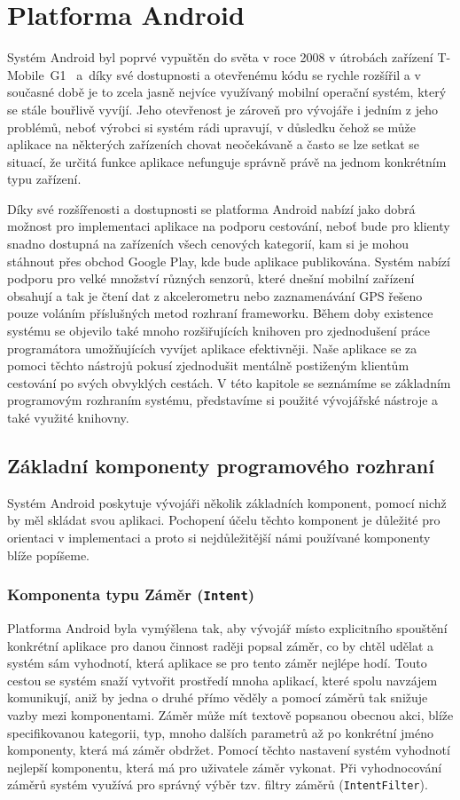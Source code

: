 \documentclass[czech,master,public,dept460,male,java,cpdeclaration]{diploma}
\begin{document}
\section{Platforma Android}
Systém Android byl poprvé vypuštěn do světa v roce 2008 v útrobách zařízení T-Mobile~G1~\cite{androidcentral}
a~díky své dostupnosti a otevřenému kódu se rychle rozšířil a v současné době je to zcela jasně nejvíce využívaný mobilní
operační systém, který se stále bouřlivě vyvíjí. Jeho otevřenost je zároveň pro vývojáře i jedním z jeho problémů,
neboť výrobci si systém rádi upravují, v důsledku čehož se může aplikace na některých zařízeních chovat
neočekávaně a často se lze setkat se situací, že určitá funkce aplikace nefunguje správně právě na
jednom konkrétním typu zařízení.

Díky své rozšířenosti a dostupnosti se platforma Android nabízí jako dobrá možnost pro implementaci
aplikace na podporu cestování, neboť bude pro klienty snadno dostupná na zařízeních všech cenových
kategorií, kam si je mohou stáhnout přes obchod Google Play, kde bude aplikace publikována.
Systém nabízí podporu pro velké množství různých senzorů, které dnešní mobilní zařízení obsahují
a tak je čtení dat z akcelerometru nebo zaznamenávání GPS řešeno pouze voláním příslušných metod
rozhraní frameworku. Během doby existence systému se objevilo také mnoho rozšiřujících knihoven
pro zjednodušení práce programátora umožňujících vyvíjet aplikace efektivněji. Naše aplikace se
za pomoci těchto nástrojů pokusí zjednodušit mentálně postiženým klientům cestování po svých
obvyklých cestách. V této kapitole se seznámíme se základním programovým rozhraním systému, představíme
si použité vývojářské nástroje a také využité knihovny.

\subsection{Základní komponenty programového rozhraní}
Systém Android poskytuje vývojáři několik základních komponent, pomocí nichž by měl skládat svou aplikaci.
Pochopení účelu těchto komponent je důležité pro orientaci v implementaci a proto si nejdůležitější námi
používané komponenty blíže popíšeme.

\subsubsection{Komponenta typu Záměr (\texttt{Intent})}
Platforma Android byla vymýšlena tak, aby vývojář místo explicitního spouštění konkrétní aplikace pro danou činnost
raději popsal záměr, co by chtěl udělat a systém sám vyhodnotí, která aplikace se pro tento záměr nejlépe
hodí. Touto cestou se systém snaží vytvořit prostředí mnoha aplikací, které spolu navzájem komunikují,
aniž by jedna o druhé přímo věděly a pomocí záměrů tak snižuje vazby mezi komponentami. Záměr může mít
textově popsanou obecnou akci, blíže specifikovanou kategorii, typ, mnoho dalších parametrů až po konkrétní
jméno komponenty, která má záměr obdržet. Pomocí těchto nastavení systém vyhodnotí nejlepší komponentu,
která má pro uživatele záměr vykonat. Při vyhodnocování záměrů systém využívá pro správný výběr
 tzv. filtry záměrů (\texttt{IntentFilter}).
\end{document}
